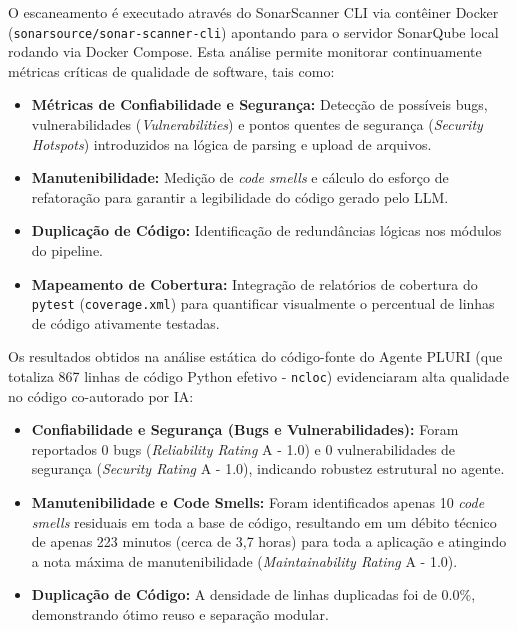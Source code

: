 \documentclass[sigconf]{acmart}
\begin{document}
O escaneamento é executado através do SonarScanner CLI via contêiner Docker (\lstinline{sonarsource/sonar-scanner-cli}) apontando para o servidor SonarQube local rodando via Docker Compose. Esta análise permite monitorar continuamente métricas críticas de qualidade de software, tais como:
\begin{itemize}
\item \textbf{Métricas de Confiabilidade e Segurança:} Detecção de possíveis bugs, vulnerabilidades (\textit{Vulnerabilities}) e pontos quentes de segurança (\textit{Security Hotspots}) introduzidos na lógica de parsing e upload de arquivos.
\item \textbf{Manutenibilidade:} Medição de \textit{code smells} e cálculo do esforço de refatoração para garantir a legibilidade do código gerado pelo LLM.
\item \textbf{Duplicação de Código:} Identificação de redundâncias lógicas nos módulos do pipeline.
\item \textbf{Mapeamento de Cobertura:} Integração de relatórios de cobertura do \lstinline{pytest} (\lstinline{coverage.xml}) para quantificar visualmente o percentual de linhas de código ativamente testadas.
\end{itemize}

Os resultados obtidos na análise estática do código-fonte do Agente PLURI (que totaliza 867 linhas de código Python efetivo - \lstinline{ncloc}) evidenciaram alta qualidade no código co-autorado por IA:
\begin{itemize}
\item \textbf{Confiabilidade e Segurança (Bugs e Vulnerabilidades):} Foram reportados 0 bugs (\textit{Reliability Rating} A - 1.0) e 0 vulnerabilidades de segurança (\textit{Security Rating} A - 1.0), indicando robustez estrutural no agente.
\item \textbf{Manutenibilidade e Code Smells:} Foram identificados apenas 10 \textit{code smells} residuais em toda a base de código, resultando em um débito técnico de apenas 223 minutos (cerca de 3,7 horas) para toda a aplicação e atingindo a nota máxima de manutenibilidade (\textit{Maintainability Rating} A - 1.0).
\item \textbf{Duplicação de Código:} A densidade de linhas duplicadas foi de 0.0\%, demonstrando ótimo reuso e separação modular.
\end{itemize}
\end{document}
